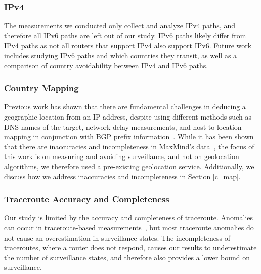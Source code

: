 \subsubsection{IPv4}
The measurements we conducted only collect and analyze IPv4 paths, and therefore all IPv6 paths are left out of our study.  IPv6 paths likely differ from IPv4 paths as not all routers that support IPv4 also support IPv6.  Future work includes studying IPv6 paths and which countries they transit, as well as a comparison of country avoidability between IPv4 and IPv6 paths. 

\subsubsection{Country Mapping}
Previous work has shown that there are fundamental challenges in deducing a geographic location from an IP address, despite using different methods such as DNS names of the target, network delay measurements, and host-to-location mapping in conjunction with BGP prefix information~\cite{padmanabhan2001investigation}.  While it has been shown that there are inaccuracies and incompleteness in MaxMind's data~\cite{huffaker2011geocompare}, the focus of this work is on measuring and avoiding surveillance, and not on geolocation algorithms, we therefore used a pre-existing geolocation service. Additionally, we discuss how we address inaccuracies and incompleteness in Section \ref{c_map}.

\subsubsection{Traceroute Accuracy and Completeness}
Our study is limited by the accuracy and completeness of traceroute.  Anomalies can occur in traceroute-based measurements~\cite{augustin2006avoiding}, but most traceroute anomalies do not cause an overestimation in surveillance states.  The incompleteness of traceroutes, where a router does not respond, causes our results to underestimate the number of surveillance states, and therefore also provides a lower bound on surveillance.
